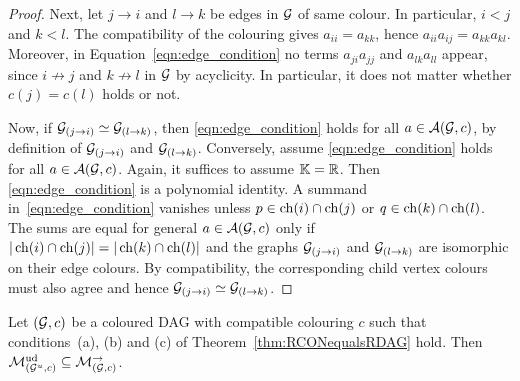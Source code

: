 \begin{proof}
	Next, let $j \to i$ and $l \to k$ be edges in $\mathcal{G}$ of same colour. In particular, $i<j$ and $k<l$. The compatibility of the colouring gives $a_{ii} = a_{kk}$, hence $a_{ii} a_{ij} = a_{kk} a_{kl}$.
	Moreover, in Equation~\eqref{eqn:edge_condition} no terms $a_{ji} a_{jj}$ and $a_{lk} a_{ll}$ appear, since $i \not\to j$ and $k \not\to l$ in $\mathcal{G}$ by acyclicity. In particular, it does not matter whether $c(j) = c(l)$ holds or not.
	
	Now, if $\mathcal{G}_{(j \to i)} \simeq \mathcal{G}_{(l \to k)}$, then \eqref{eqn:edge_condition} holds for all $a \in \mathcal{A}(\mathcal{G}, c)$, by definition of $\mathcal{G}_{(j \to i)}$ and $\mathcal{G}_{(l \to k)}$.
	Conversely, assume \eqref{eqn:edge_condition} holds for all $a \in \mathcal{A}(\mathcal{G}, c)$. Again, it suffices to assume $\mathbb K=\mathbb R$. Then \eqref{eqn:edge_condition} is a polynomial identity.
	A summand in~\eqref{eqn:edge_condition} vanishes unless $p \in \operatorname{ch}(i) \cap \operatorname{ch}(j)$ or $q \in \operatorname{ch}(k) \cap \operatorname{ch}(l)$. The sums are equal for general $a \in \mathcal{A}(\mathcal{G}, c)$ only if $\vert \operatorname{ch}(i) \cap \operatorname{ch}(j) \vert = \vert \operatorname{ch}(k) \cap \operatorname{ch}(l) \vert$ and the graphs $\mathcal{G}_{(j \to i)}$ and $\mathcal{G}_{(l \to k)}$ are isomorphic on their edge colours. By compatibility, the corresponding child vertex colours must also agree and hence $\mathcal{G}_{(j \to i)} \simeq \mathcal{G}_{(l \to k)}$.
\end{proof}


\begin{prop} \label{prop:RCONinRDAG}
	Let $(\mathcal{G}, c)$ be a coloured DAG with compatible colouring $c$ such that conditions~(a), (b) and (c) of Theorem~\ref{thm:RCONequalsRDAG} hold. Then $\mathcal{M}^{\mathrm{ud}}_{(\mathcal{G}^u, c)} \subseteq \mathcal{M}_{(\mathcal{G}, c)}^{\to}$.
\end{prop}

